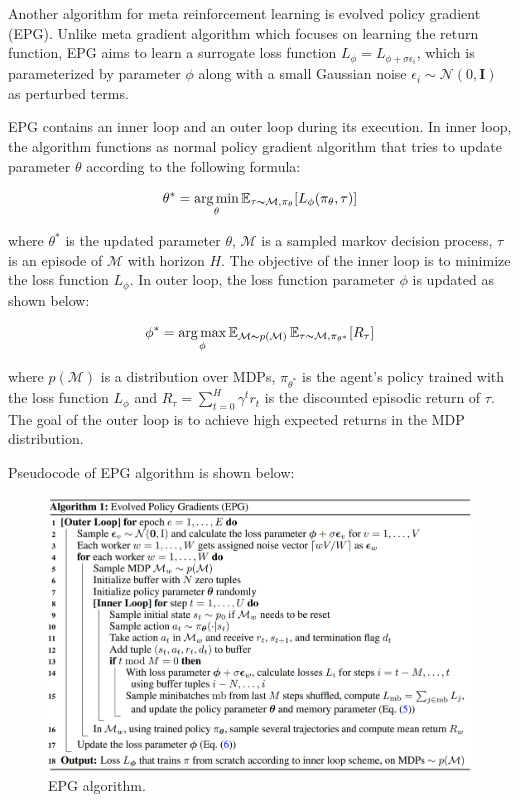 Another algorithm for meta reinforcement learning is evolved policy gradient (EPG)\cite{epg}. Unlike meta gradient algorithm which focuses on learning the return function, EPG aims to learn a surrogate loss function $L_\phi = L_{\phi + \sigma\epsilon_i}$, which is parameterized by parameter $\phi$ along with a small Gaussian noise $\epsilon_i \sim \mathcal{N}(0, \mathbf{I})$ as perturbed terms.

\par
EPG contains an inner loop and an outer loop during its execution. In inner loop, the algorithm functions as normal policy gradient algorithm that tries to update parameter $\theta$ according to the following formula:

\[\theta^* = \operatorname*{arg\,min}_\theta\operatorname{\mathbb{E}}_{\tau\thicksim\mathcal{M},\pi_\theta}[L_\phi(\pi_\theta,\tau)]\]

where $\theta^*$ is the updated parameter $\theta$, $\mathcal{M}$ is a sampled markov decision process, $\tau$ is an episode of $\mathcal{M}$ with horizon $\textit{H}$. The objective of the inner loop is to minimize the loss function $L_\phi$. In outer loop, the loss function parameter $\phi$ is updated as shown below:

\[\phi^* = \operatorname*{arg\,max}_\phi\operatorname{\mathbb{E}}_{\mathcal{M}\thicksim p(\mathcal{M})}\operatorname{\mathbb{E}}_{\tau\thicksim\mathcal{M},\pi_{\theta^*}}[R_\tau]\]

where $p(\mathcal{M})$ is a distribution over MDPs, $\pi_{\theta^*}$ is the agent's policy trained with the loss function $L_\phi$ and $R_\tau = \sum_{t=0}^{H}\gamma^t{r_t}$ is the discounted episodic return of $\tau$. The goal of the outer loop is to achieve high expected returns in the MDP distribution.

\par
Pseudocode of EPG algorithm is shown below:
\begin{figure}[H]
	\includegraphics[scale=0.4]{epg.png}
	\centering
	\caption{EPG algorithm.}
	\label{epg}
\end{figure}

